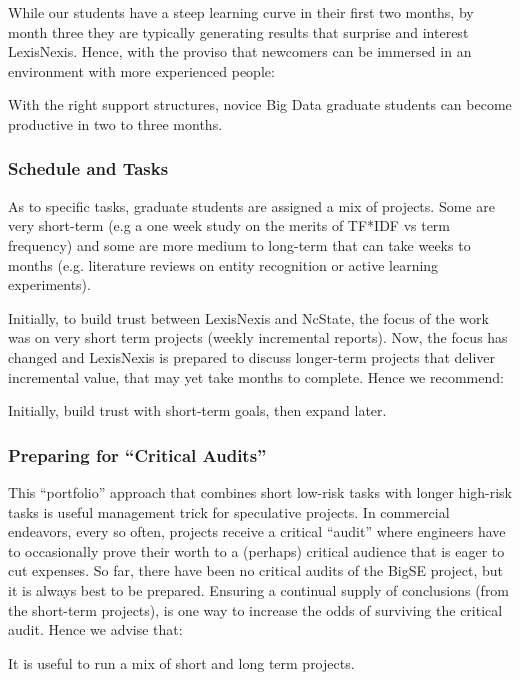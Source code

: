 \documentclass{sig-alternate-05-2015}
\theoremstyle{break}
\begin{document}
 While our  students have a steep learning curve in their
 first two months, by month three they are typically generating results that surprise and interest LexisNexis.
 Hence, with the proviso that  newcomers can be immersed in an environment
 with  more experienced people:
  \begin{lesson}
With the right support structures, novice
Big Data graduate students
can become productive in two to three months.
\end{lesson}
 \subsubsection{Schedule and Tasks}
As to specific tasks, graduate students are assigned a mix of projects. Some are very short-term (e.g a one week
study on the merits of TF*IDF vs term frequency) and some are more medium to long-term
that can take weeks to months (e.g. literature reviews on entity recognition or
active learning experiments). 

Initially, to build trust between LexisNexis and NcState, the focus of the work was on very
short term projects (weekly incremental reports). Now, the focus has changed and
LexisNexis is prepared to discuss longer-term projects that deliver incremental value, that may yet take months to complete.  Hence we recommend:
\begin{lesson}
Initially, build trust with   short-term goals,
then expand   later.
\end{lesson}
\subsubsection{Preparing for  ``Critical Audits''}
This ``portfolio'' approach  that combines short low-risk tasks with longer high-risk tasks is useful management trick for speculative projects.
In commercial endeavors, every so often, projects receive a critical  ``audit''  where engineers have to
occasionally prove their worth to a (perhaps) critical audience that is eager  to cut
expenses.  So far,
there have been no critical audits of the BigSE project, but it is always
best to be prepared.
Ensuring a continual supply of conclusions (from the short-term projects),
is one way to increase the odds of surviving the critical audit. Hence we advise that:
\begin{lesson}
It is useful to run a mix of short and long term projects.
\end{lesson}
 
  
\end{document}

